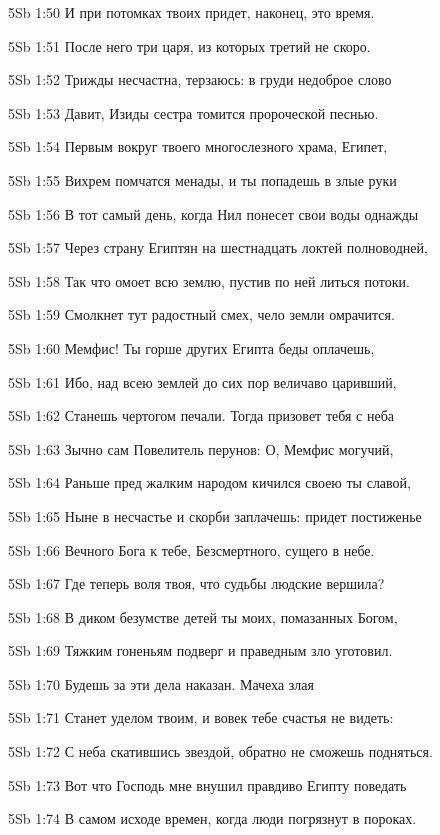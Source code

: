 \vs 5Sb 1:50 И при потомках твоих придет, наконец, это время.

\vs 5Sb 1:51 После него  три царя, из которых третий  не скоро.

\vs 5Sb 1:52 Трижды несчастна, терзаюсь: в груди недоброе слово 

\vs 5Sb 1:53 Давит, Изиды сестра томится пророческой песнью.

\vs 5Sb 1:54 Первым вокруг твоего многослезного храма, Египет,

\vs 5Sb 1:55 Вихрем помчатся менады, и ты попадешь в злые руки

\vs 5Sb 1:56 В тот самый день, когда Нил понесет свои воды однажды

\vs 5Sb 1:57 Через страну Египтян на шестнадцать локтей полноводней,

\vs 5Sb 1:58 Так что омоет всю землю, пустив по ней литься потоки.

\vs 5Sb 1:59 Смолкнет тут радостный смех, чело земли омрачится.

\vs 5Sb 1:60 Мемфис! Ты горше других Египта беды оплачешь,

\vs 5Sb 1:61 Ибо, над всею землей до сих пор величаво царивший,

\vs 5Sb 1:62 Станешь чертогом печали. Тогда призовет тебя с неба

\vs 5Sb 1:63 Зычно сам Повелитель перунов: О, Мемфис могучий,

\vs 5Sb 1:64 Раньше пред жалким народом кичился своею ты славой,

\vs 5Sb 1:65 Ныне в несчастье и скорби заплачешь: придет постиженье

\vs 5Sb 1:66 Вечного Бога к тебе, Безсмертного, сущего в небе. 

\vs 5Sb 1:67 Где теперь воля твоя, что судьбы людские вершила? 

\vs 5Sb 1:68 В диком безумстве детей ты моих, помазанных Богом, 

\vs 5Sb 1:69 Тяжким гоненьям подверг и праведным зло уготовил.

\vs 5Sb 1:70 Будешь за эти дела наказан. Мачеха злая

\vs 5Sb 1:71 Станет уделом твоим, и вовек тебе счастья не видеть: 

\vs 5Sb 1:72 С неба скатившись звездой, обратно не сможешь подняться.

\vs 5Sb 1:73 Вот что Господь мне внушил правдиво Египту поведать 

\vs 5Sb 1:74 В самом исходе времен, когда люди погрязнут в пороках.


